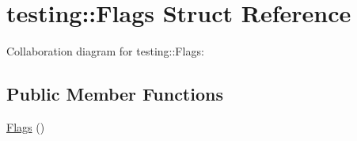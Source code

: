 \hypertarget{structtesting_1_1_flags}{}\section{testing\+:\+:Flags Struct Reference}
\label{structtesting_1_1_flags}


Collaboration diagram for testing\+:\+:Flags\+:
\subsection*{Public Member Functions}
\begin{DoxyCompactItemize}
\item 
\hyperlink{structtesting_1_1_flags_a41dc8942bec08ebc7f74dee545e6ad7e}{Flags} ()
\end{DoxyCompactItemize}

